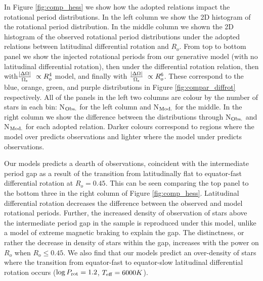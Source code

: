 In Figure \ref{fig:comp_hess} we show how the adopted relations impact the rotational period distributions.
In the left column we show the 2D histogram of the \citet{mcquillan_rotation_2014} rotational period distribution.
In the middle column we shown the 2D histogram of the observed rotational period distributions under the adopted relations between latitudinal differential rotation and $R_o$.
From top to bottom panel we show the injected rotational periods from our generative model (with no latitudinal differential rotation), then under the \citet{saar_starspots_2011} differential rotation relation, then with$\frac{|\Delta\Omega|}{\Omega_{\rm{s}}} \ \propto R_o^4$ model, and finally with $\frac{|\Delta\Omega|}{\Omega_{\rm{s}}} \ \propto R_o^6$.
These correspond to the blue, orange, green, and purple distributions in Figure \ref{fig:compar_diffrot} respectively.
All of the panels in the left two columns are colour by the number of stars in each bin: N$_{\rm{Obs.}}$ for the left column and N$_{\rm{Mod.}}$ for the middle.
In the right column we show the difference between the distributions through N$_{\rm{Obs.}}$ and N$_{\rm{Mod.}}$ for each adopted relation.
Darker colours correspond to regions where the model over predicts observations and lighter where the model under predicts observations.

Our models predicts a dearth of observations, coincident with the intermediate period gap as a result of the transition from latitudinally flat to equator-fast differential rotation at $R_o = 0.45$.
This can be seen comparing the top panel to the bottom three in the right column of Figure \ref{fig:comp_hess}.
Latitudinal differential rotation decreases the difference between the observed and model rotational periods.
Further, the increased density of observation of stars above the intermediate period gap in the \kepler{} sample is reproduced under this model, unlike a model of extreme magnetic braking to explain the gap.
The distinctness, or rather the decrease in density of stars within the gap, increases with the power on $R_o$ when $R_o \leq 0.45$.
We also find that our models predict an over-density of stars where the transition from equator-fast to equator-slow latitudinal differential rotation occurs ($\log P_{\rm{rot}} = 1.2$, $T_{\rm{eff}} = 6000K$).

